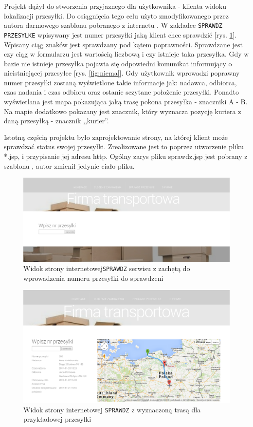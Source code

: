 \documentclass[eng,printmode,oneside]{mgr}
\begin{document}
Projekt dążył do stworzenia przyjaznego dla użytkownika - klienta widoku
lokalizacji przesyłki. Do osiągnięcia tego celu użyto zmodyfikowanego przez
autora darmowego szablonu pobranego z internetu \cite{szablon}. W zakładce
\texttt{SPRAWDZ PRZESYLKE} wpisywany jest numer przesyłki jaką klient chce
sprawdzić [rys.
\ref{fig:sprawdz}]. Wpisany ciąg znaków jest sprawdzany pod kątem poprawności.
Sprawdzane jest czy ciąg w formularzu jest wartością liczbową i czy istnieje
taka przesyłka. Gdy w bazie nie istnieje przesyłka pojawia się odpowiedni komunikat
informujący o nieistniejącej przesyłce [rys. \ref{fig:niema}]. Gdy użytkownik
wprowadzi poprawny numer przesyłki zostaną wyświetlone takie informacje jak:
nadawca, odbiorca, czas nadania i czas odbioru oraz ostanie sczytane położenie
przesyłki. Ponadto wyświetlana jest mapa pokazująca jaką trasę pokona przesyłka
- znaczniki A - B. Na mapie dodatkowo pokazany jest znacznik, który wyznacza
pozycję kuriera z daną przesyłką - znacznik ,,kurier''.

Istotną częścią projektu było zaprojektowanie strony, na której
klient może sprawdzać status swojej przesyłki. Zrealizowane jest to poprzez
utworzenie pliku *.jsp, i przypisanie jej adresu http. Ogólny zarys pliku sprawdz.jsp jest
pobrany z szablonu \cite{szablon}, autor zmienił jedynie ciało pliku. 

\begin{figure}[ht!]
\centering
\includegraphics[width=\textwidth]{sprawdz.png}
\caption{Widok strony internetowej\texttt{SPRAWDZ} serwisu z zachętą do
wprowadzenia numeru przesyłki do sprawdzeni}
\label{fig:sprawdz}
\end{figure}

\begin{figure}[ht!]
\centering
\includegraphics[width=\textwidth]{przyklad.png}
\caption{Widok strony internetowej \texttt{SPRAWDZ} z wyznaczoną trasą dla
przykładowej przesylki}
\label{fig:pokaz}
\end{figure}
\end{document}
